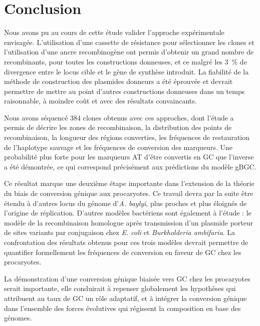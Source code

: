 \section*{Conclusion}
\label{sec:conclusion}

Nous avons pu au cours de cette étude valider l'approche expérimentale
envisagée. L'utilisation d'une cassette de résistance pour sélectionner les
clones et l'utilisation d'une ancre recombinogène ont permis d'obtenir un grand
nombre de recombinants, pour toutes les constructions donneuses, et ce malgré
les \SI{3}{\percent} de divergence entre le locus cible et le gène de synthèse
introduit. La fiabilité de la méthode de construction des plasmides donneurs a
été éprouvée et devrait permettre de mettre au point d'autres constructions
donneuses dans un temps raisonnable, à moindre coût et avec des résultats
convaincants.

Nous avons séquencé 384 clones obtenus avec ces approches, dont l'étude a permis
de décrire les zones de recombinaison, la distribution des points de
recombinaison, la longueur des régions converties, les fréquences de
restauration de l'haplotype sauvage et les fréquences de conversion des
marqueurs. Une probabilité plus forte pour les marqueurs AT d'être convertis en
GC que l'inverse a été démontrée, ce qui correspond précisément aux prédictions
du modèle gBGC.

Ce résultat marque une deuxième étape importante dans l'extension de la théorie
du biais de conversion génique aux procaryotes. Ce travail devra par la suite
être étendu à d'autres locus du génome d'\emph{A. baylyi}, plus proches et plus
éloignés de l'origine de réplication. D'autres modèles bactériens sont également
à l'étude : le modèle de la recombinaison homologue après transmission d'un
plasmide porteur de sites variants par conjugaison chez \emph{E. coli} et
\emph{Burkholderia ambifaria}. La confrontation des résultats obtenus pour ces
trois modèles devrait permettre de quantifier formellement les fréquences de
conversion en faveur de GC chez les procaryotes.

La démonstration d'une conversion génique biaisée vers GC chez les procaryotes
serait importante, elle conduirait à repenser globalement les hypothèses qui
attribuent au taux de GC un rôle adaptatif, et à intégrer la conversion génique
dans l'ensemble des forces évolutives qui régissent la composition en base des
génomes.